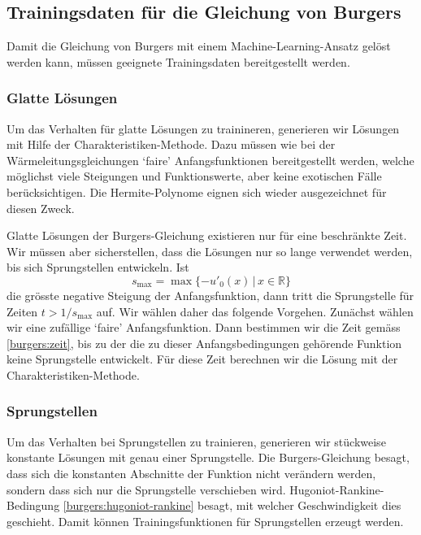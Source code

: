 %
%
%
\subsection{Trainingsdaten für die Gleichung von Burgers\label{burgers:training}}
Damit die Gleichung von Burgers mit einem Machine-Learning-Ansatz gelöst
werden kann, müssen geeignete Trainingsdaten bereitgestellt werden.


\subsubsection{Glatte Lösungen}
Um das Verhalten für glatte Lösungen zu trainineren, generieren
wir Lösungen mit Hilfe der Cha\-rak\-te\-ris\-ti\-ken-Methode.
Dazu müssen wie bei der Wärmeleitungsgleichungen `faire' Anfangsfunktionen 
bereitgestellt werden, welche möglichst viele Steigungen und Funktionswerte,
aber keine exotischen Fälle berücksichtigen.
Die Hermite-Polynome eignen sich wieder ausgezeichnet für diesen Zweck.

Glatte Lösungen der Burgers-Gleichung existieren nur für eine beschränkte Zeit.
Wir müssen aber sicherstellen, dass die Lösungen nur so lange verwendet
werden, bis sich Sprungstellen entwickeln.
Ist
\begin{equation}
s_{\text{max}} = \max \{ -u'_0(x)\,|\, x\in\mathbb R\}
\label{burgers:zeit}
\end{equation}
die grösste negative Steigung der Anfangsfunktion, dann tritt die Sprungstelle
für Zeiten $t> 1/s_{\text{max}}$ auf.
Wir wählen daher das folgende Vorgehen.
Zunächst wählen wir eine zufällige `faire' Anfangsfunktion.
Dann bestimmen wir die Zeit
gemäss \eqref{burgers:zeit}, bis zu der die zu dieser Anfangsbedingungen
gehörende Funktion keine Sprungstelle entwickelt.
Für diese Zeit berechnen wir die Lösung mit der Charakteristiken-Methode.

\subsubsection{Sprungstellen}
Um das Verhalten bei Sprungstellen zu trainieren, generieren wir
stückweise konstante Lösungen mit genau einer Sprungstelle.
Die Burgers-Gleichung besagt, dass sich die konstanten Abschnitte
der Funktion nicht verändern werden, sondern dass sich nur die Sprungstelle
verschieben wird.
Hugoniot-Rankine-Bedingung \eqref{burgers:hugoniot-rankine} besagt,
mit welcher Geschwindigkeit dies geschieht.
Damit können Trainingsfunktionen für Sprungstellen erzeugt werden.

